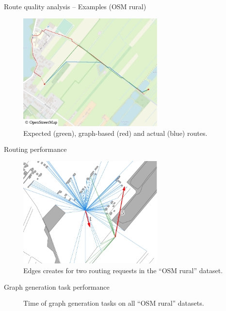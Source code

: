 \documentclass[xcolor={x11names}]{beamer}
\newenvironment{figcenter}
{%
	\parskip=0pt%
	\par%
	\nopagebreak%
	\centering%
}%
{%
	\par%
	\noindent%
	\ignorespacesafterend%
}
\begin{document}
	\begin{frame}{Route quality analysis -- Examples (OSM rural)}
		\begin{figure}
			\begin{figcenter}
				\includegraphics[width=0.65\textwidth]{../thesis/images/qgis-routing-rural-routing-17-graph-based.pdf}
			\end{figcenter}
			\caption{Expected (green), graph-based (red) and actual (blue) routes.}
		\end{figure}
	\end{frame}
	
	\begin{frame}{Routing performance}
		\begin{figure}
			\begin{figcenter}
				\includegraphics[width=0.65\textwidth]{../thesis/images/qgis-osm-rural.pdf}
			\end{figcenter}
			\caption{Edges creates for two routing requests in the \enquote{OSM rural} dataset.}
		\end{figure}
	\end{frame}
	
	\begin{frame}{Graph generation task performance}
		\begin{figure}
			\begin{figcenter}
				\hspace*{-0.35cm}
				\scalebox{0.7}
				{
					
				}
			\end{figcenter}
			\caption{Time of graph generation tasks on all \enquote{OSM rural} datasets.}
		\end{figure}
	\end{frame}
	
\end{document}
